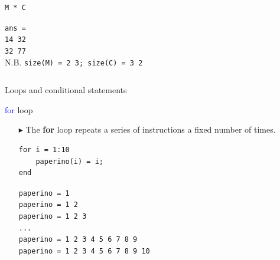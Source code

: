 \documentclass[aspectratio=169]{beamer}
\begin{document}
\begin{frame}[fragile]{}
\begin{columns}
\begin{itemize}
            \begin{verbatim}
M * C
            \end{verbatim}
            \texttt{ans =} \\
            \texttt{14 \hspace{3em}32} \\
            \texttt{32 \hspace{3em}77} \\
            \vspace{5pt}
            \alert{N.B.} \footnotesize{\texttt{size(M) = 2 3; size(C) =  3 2}}
        \end{itemize}
    \end{columns}
\end{frame}

{
    \begin{frame}[standout]
        Loops and conditional statements
    \end{frame}
}
\begin{frame}[fragile]{\textcolor{blue}{for} loop}
    \begin{itemize}
        \item[$\blacktriangleright$]
        The \textbf{for} loop repeats a series of instructions a
        \alert{fixed number of times}.
        \begin{verbatim}
for i = 1:10
    paperino(i) = i;
end
        \end{verbatim}
        \texttt{paperino = 1} \\
        \texttt{paperino = 1 2} \\
        \texttt{paperino = 1 2 3} \\
        \texttt{...} \\
        \texttt{paperino = 1 2 3 4 5 6 7 8 9} \\
        \texttt{paperino = 1 2 3 4 5 6 7 8 9 10}
    \end{itemize}
\end{frame}
\end{document}
